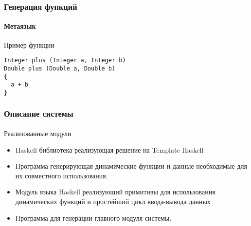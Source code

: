 \documentclass[ucs]{beamer}
\begin{document}

\begin{frame}[fragile]
  \frametitle{Генерация функций}
  \framesubtitle{Метаязык}

  \begin{block}{Пример функции}
\begin{verbatim}
Integer plus (Integer a, Integer b)
Double plus (Double a, Double b)
{
  a + b
}
\end{verbatim}
  \end{block}
\end{frame}

\begin{frame}[fragile]
  \frametitle{Описание системы}
  \framesubtitle{}
  
  \begin{block}{Реализованные модули}
    \begin{itemize}
    \item Haskell библиотека реализующая решение на Template Haskell
    \item Программа генерирующая динамические функции и данные
      необходимые для их совместного использования.
    \item Модуль языка Haskell реализующий примитивы для использования
      динамических функций и простейший цикл ввода-вывода данных
    \item Программа для генерации главного модуля системы.
    \end{itemize}
  \end{block}
\end{frame}
\end{document}
